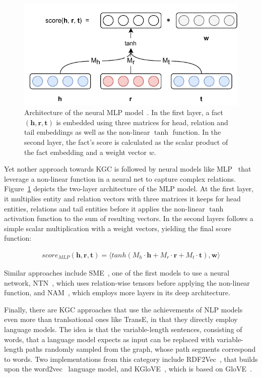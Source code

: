 \begin{figure}[t]
    \centering
    \includegraphics{3_related_work/2_embedding_based/mlp}
    \caption{Architecture of the neural MLP model~\cite{Dong2014KnowledgeVA}. In the first layer, a fact $(\textbf{h}, \textbf{r}, \textbf{t})$ is embedded using three matrices for head, relation and tail embeddings as well as the non-linear $\tanh$ function. In the second layer, the fact's score is calculated as the scalar product of the fact embedding and a weight vector $w$.}
    \label{fig:3_related_work/2_embedding_based/mlp}
\end{figure}

Yet nother approach towards KGC is followed by neural models like MLP~\cite{Dong2014KnowledgeVA} that leverage a non-linear function in a neural net to capture complex relations. Figure~\ref{fig:3_related_work/2_embedding_based/mlp} depicts the two-layer architecture of the MLP model. At the first layer, it multiplies entity and relation vectors with three matrices it keeps for head entities, relations and tail entities before it applies the non-linear $\tanh$ activation function to the sum of resulting vectors. In the second layers follows a simple scalar multiplication with a weight vectors, yielding the final score function:

\begin{align}
    score_{MLP}(\textbf{h}, \textbf{r}, \textbf{t}) = \langle tanh(M_h \cdot \textbf{h} + M_r \cdot \textbf{r} + M_t \cdot \textbf{t}), \textbf{w} \rangle
    \label{eq:3_related_work/2_embedding_based/mlp}
\end{align}

Similar approaches include SME~\cite{Glorot2013ASM}, one of the first models to use a neural network, NTN~\cite{Socher2013ReasoningWN}, which uses relation-wise tensors before applying the non-linear function, and NAM~\cite{LIU2016ProbabilisticRV}, which employs more layers in its deep architecture.

Finally, there are KGC approaches that use the achievements of NLP models even more than tranlsational ones like TransE, in that they directly employ language models. The idea is that the variable-length sentences, consisting of words, that a language model expects as input can be replaced with variable-length paths randomly sampled from the graph, whose path segments correspond to words. Two implementations from this category include RDF2Vec~\cite{Ristoski2016RDF2VecRG}, that builds upon the word2vec~\cite{Mikolov2013EfficientEO} language model, and KGloVE~\cite{Cochez2017GlobalRV}, which is based on GloVE~\cite{Pennington2014GloveGV}.
